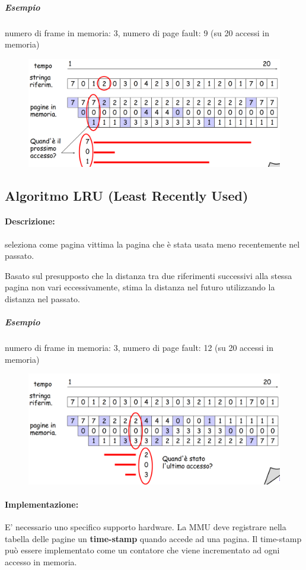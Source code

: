\subparagraph{Esempio}
numero di frame in memoria: 3, numero di page fault: 9 (su 20 accessi in memoria)

\begin{figure} [h]
    \centering
    \includegraphics[width=0.7\linewidth]{Images/Screenshot 2025-01-17 at 17-53-59 so-05-memoria - so-05-memoria.pdf.png}
\end{figure}

\subsection{Algoritmo LRU (Least Recently Used)}
\paragraph{Descrizione:} seleziona come pagina vittima la pagina che è stata usata meno recentemente nel passato.

Basato sul presupposto che la distanza tra due riferimenti successivi alla stessa pagina non vari eccessivamente, stima la distanza nel futuro utilizzando la distanza nel passato.

\subparagraph{Esempio}
numero di frame in memoria: 3, numero di page fault: 12 (su 20 accessi in memoria)

\begin{figure} [h]
    \centering
    \includegraphics[width=0.7\linewidth]{Images/Screenshot 2025-01-17 at 17-56-57 so-05-memoria - so-05-memoria.pdf.png}
\end{figure}

\paragraph{Implementazione:} E' necessario uno specifico supporto hardware.
La MMU deve registrare nella tabella delle pagine un \textbf{time-stamp} quando accede ad una pagina. Il time-stamp può essere implementato come un contatore che viene incrementato ad ogni accesso in memoria.

